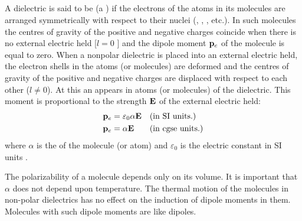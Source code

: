 \subsection{}\label{18.1.3} A dielectric is said to be  (a ) if the electrons of the atoms in its molecules are arranged symmetrically with respect to their nuclei (, , , etc.). In such molecules the centres of gravity of the positive and negative charges coincide when there is no external electric held [$l = 0$ ] and the dipole moment $\vb{p}_{e}$ of the molecule is equal to zero. When a nonpolar dielectric is placed into an external electric held, the electron shells  in the atoms (or molecules) are deformed and the centres of gravity of the positive and negative charges are displaced with respect to each other ($l \neq  0$). At this an  appears in atoms (or molecules) of the dielectric. This moment is proportional to the strength $\vb{E}$ of the external electric held:
\begin{align*}
\vb{p}_{e} & = \varepsilon_{0} \alpha \vb{E} && \text{(in SI units.)} \\
\vb{p}_{e} & =  \alpha \vb{E}&& \text{(in cgse units.)}
\end{align*}
where $\alpha$ is the  of the molecule (or atom) and $\varepsilon_{0}$ is the electric constant in SI units .


The polarizability of a molecule depends only on its volume. It is important that $\alpha$ does not depend upon temperature. The thermal motion of the molecules in non-polar dielectrics has no effect on the induction of dipole moments in them. Molecules with such dipole moments are like  dipoles.

